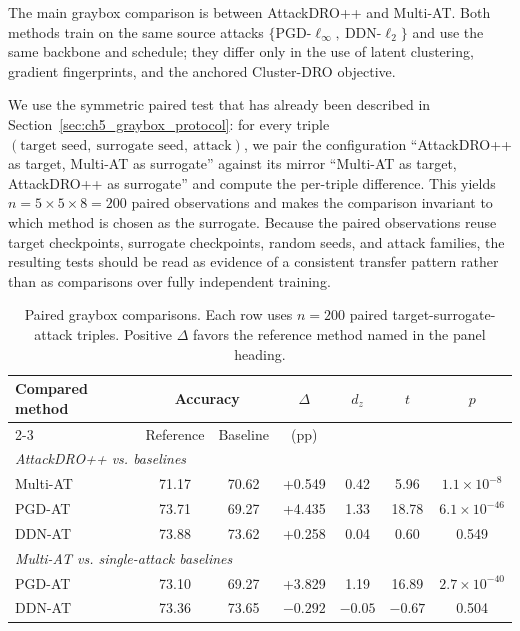 The main graybox comparison is between AttackDRO++ and Multi-AT.
Both methods train on the same source attacks
$\{\text{PGD-}\ell_\infty,\ \text{DDN-}\ell_2\}$ and use the same backbone
and schedule; they differ only in the use of latent clustering, gradient
fingerprints, and the anchored Cluster-DRO objective.

We use the symmetric paired test that has already been described in
Section~\ref{sec:ch5_graybox_protocol}: for every triple
$(\text{target seed},\ \text{surrogate seed},\ \text{attack})$, we pair
the configuration ``AttackDRO++ as target, Multi-AT as surrogate'' against
its mirror ``Multi-AT as target, AttackDRO++ as surrogate'' and compute
the per-triple difference. This yields \(n = 5 \times 5 \times 8 = 200\)
paired observations and makes the comparison invariant to which method is chosen
as the surrogate. Because the paired observations reuse target checkpoints, surrogate checkpoints,
random seeds, and attack families, the resulting tests should be read as evidence
of a consistent transfer pattern rather than as comparisons over fully independent
training.
\begin{table}[H]
\centering
\caption[Paired graybox comparisons]{Paired graybox comparisons. Each row uses $n=200$ paired
target-surrogate-attack triples. Positive $\Delta$ favors the reference
method named in the panel heading.}
\label{tab:ch6_paired_graybox_two_panel}
\begin{tabular}{lcccccc}
\toprule
Compared method
& \multicolumn{2}{c}{Accuracy}
& $\Delta$
& $d_z$
& $t$
& $p$ \\
\cmidrule(lr){2-3}
& Reference
& Baseline
& (pp)
& 
& 
&  \\
\midrule

\multicolumn{7}{l}{\textit{AttackDRO++ vs. baselines}} \\
\midrule
Multi-AT
& 71.17
& 70.62
& +0.549
& 0.42
& 5.96
& $1.1{\times}10^{-8}$ \\

PGD-AT
& 73.71
& 69.27
& +4.435
& 1.33
& 18.78
& $6.1{\times}10^{-46}$ \\

DDN-AT
& 73.88
& 73.62
& +0.258
& 0.04
& 0.60
& 0.549 \\

\midrule
\multicolumn{7}{l}{\textit{Multi-AT vs. single-attack baselines}} \\
\midrule
PGD-AT
& 73.10
& 69.27
& +3.829
& 1.19
& 16.89
& $2.7{\times}10^{-40}$ \\

DDN-AT
& 73.36
& 73.65
& $-0.292$
& $-0.05$
& $-0.67$
& 0.504 \\

\bottomrule
\end{tabular}
\end{table}

